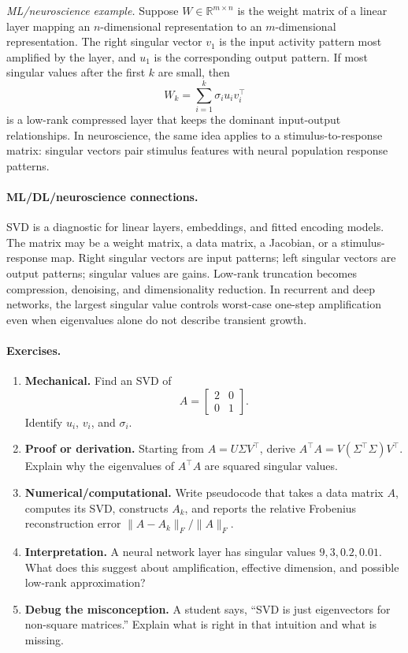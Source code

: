 \emph{ML/neuroscience example.} Suppose \(W\in\mathbb{R}^{m\times n}\) is the weight matrix of a linear layer mapping an \(n\)-dimensional representation to an \(m\)-dimensional representation. The right singular vector \(v_1\) is the input activity pattern most amplified by the layer, and \(u_1\) is the corresponding output pattern. If most singular values after the first \(k\) are small, then
\[
W_k=\sum_{i=1}^k\sigma_i u_i v_i^\top
\]
is a low-rank compressed layer that keeps the dominant input-output relationships. In neuroscience, the same idea applies to a stimulus-to-response matrix: singular vectors pair stimulus features with neural population response patterns.

\paragraph{ML/DL/neuroscience connections.}
SVD is a diagnostic for linear layers, embeddings, and fitted encoding models. The matrix may be a weight matrix, a data matrix, a Jacobian, or a stimulus-response map. Right singular vectors are input patterns; left singular vectors are output patterns; singular values are gains. Low-rank truncation becomes compression, denoising, and dimensionality reduction. In recurrent and deep networks, the largest singular value controls worst-case one-step amplification even when eigenvalues alone do not describe transient growth.

\paragraph{Exercises.}
\begin{enumerate}[label=\textbf{6.3.\arabic*.}, leftmargin=*]
\item \textbf{Mechanical.} Find an SVD of
\[
A=\begin{bmatrix}2&0\\0&1\end{bmatrix}.
\]
Identify \(u_i\), \(v_i\), and \(\sigma_i\).
\item \textbf{Proof or derivation.} Starting from \(A=U\Sigma V^\top\), derive \(A^\top A=V(\Sigma^\top\Sigma)V^\top\). Explain why the eigenvalues of \(A^\top A\) are squared singular values.
\item \textbf{Numerical/computational.} Write pseudocode that takes a data matrix \(A\), computes its SVD, constructs \(A_k\), and reports the relative Frobenius reconstruction error \(\|A-A_k\|_F/\|A\|_F\).
\item \textbf{Interpretation.} A neural network layer has singular values \(9, 3, 0.2, 0.01\). What does this suggest about amplification, effective dimension, and possible low-rank approximation?
\item \textbf{Debug the misconception.} A student says, ``SVD is just eigenvectors for non-square matrices.'' Explain what is right in that intuition and what is missing.
\end{enumerate}

